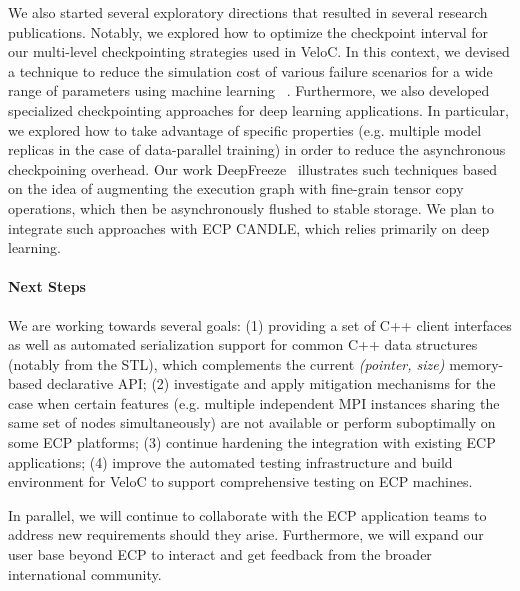 We also started several exploratory directions that resulted in
several research publications. Notably, we explored how to optimize
the checkpoint interval for our multi-level checkpointing strategies
used in VeloC. In this context, we devised a technique to reduce the
simulation cost of various failure scenarios for a wide range of
parameters using machine learning ~\cite{MLCkpt20}. Furthermore, we
also developed specialized checkpointing approaches for deep learning
applications.  In particular, we explored how to take advantage of
specific properties (e.g. multiple model replicas in the case of
data-parallel training) in order to reduce the asynchronous
checkpoining overhead. Our work DeepFreeze~\cite{DeepFreeze20}
illustrates such techniques based on the idea of augmenting the
execution graph with fine-grain tensor copy operations, which then be
asynchronously flushed to stable storage. We plan to integrate such
approaches with ECP CANDLE, which relies primarily on deep learning.

\paragraph{Next Steps}
We are working towards several goals: (1) providing a set of C++
client interfaces as well as automated serialization support for
common C++ data structures (notably from the STL), which complements
the current \emph{(pointer, size)} memory-based declarative API; (2)
investigate and apply mitigation mechanisms for the case when certain
features (e.g. multiple independent MPI instances sharing the same set
of nodes simultaneously) are not available or perform suboptimally on
some ECP platforms; (3) continue hardening the integration with
existing ECP applications; (4) improve the automated testing
infrastructure and build environment for VeloC to support
comprehensive testing on ECP machines.

In parallel, we will continue to collaborate with the ECP application
teams to address new requirements should they arise.  Furthermore, we
will expand our user base beyond ECP to interact and get feedback from
the broader international community.
